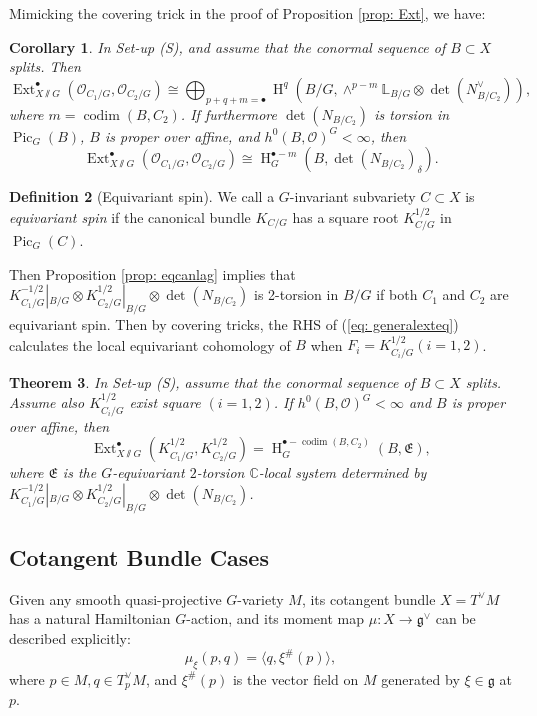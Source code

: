 \documentclass[12pt]{amsart}
\newtheorem{theorem}{Theorem}[section]
\newtheorem{corollary}[theorem]{Corollary}
\theoremstyle{definition}
\newtheorem{definition}[theorem]{Definition}
\theoremstyle{remark}
\numberwithin{equation}{section}
\newcommand{\CC}{\mathbb{C}}
\newcommand{\LL}{\mathbb{L}}
\newcommand{\shO}{\mathcal{O}}
\newcommand{\codim}{\operatorname{codim}}
\newcommand{\Ext}{\operatorname{Ext}}
\newcommand{\Pic}{\operatorname{Pic}}
\newcommand{\arw}{\longrightarrow}
\newcommand{\Hdot}{\operatorname{H}}
\begin{document}
Mimicking the covering trick in the proof of Proposition \ref{prop: Ext}, we have:
\begin{corollary}\label{symredext2} In Set-up (S), and assume that the conormal sequence of $B\subset X$ splits. Then 
   $$ \Ext^{\bullet}_{X\sslash  G}(\shO_{C_1/G},\shO_{C_2/G})\cong\bigoplus_{p+q+m=\bullet}
\Hdot^q(B/G, \wedge^{p-m}\LL_{B/G}\otimes \det(N_{B/C_2}^{\vee})), $$
where $m=\codim(B, C_2)$. 
If furthermore $\det(N_{B/C_2})$ is torsion in $\Pic_G(B)$, $B$ is proper over affine, and $h^0(B, \shO)^G<\infty$, then 
$$\Ext^{\bullet}_{X\sslash  G}(\shO_{C_1/G},\shO_{C_2/G})\cong \Hdot^{\bullet-m}_G(B, \det(N_{B/C_2})_{\delta}).$$

\end{corollary}
\begin{definition}[Equivariant spin]
    We call a $G$-invariant subvariety $C\subset X$ is \emph{equivariant spin} if the canonical bundle $K_{C/G}$ has a square root $K_{C/G}^{1/2}$ in $\Pic_G(C)$.
\end{definition}  
Then Proposition \ref{prop: eqcanlag} implies that $K_{C_1/G}^{-1/2}|_{B/G}\otimes K_{C_2/G}^{1/2}|_{B/G}\otimes \det(N_{B/C_2})$ is 2-torsion in $B/G$ if both $C_1$ and $C_2$ are equivariant spin. Then by covering tricks,  
the RHS of (\ref{eq: generalexteq}) calculates the local equivariant cohomology of $B$ when $F_i=K_{C_i/G}^{1/2} (i=1,2)$. 
 \begin{theorem}\label{thm: can}
    In Set-up (S), assume that the conormal sequence of $B\subset X$ splits. Assume also $K_{C_i/G}^{1/2}$ exist square $(i=1,2)$. If $h^0(B, \shO)^G<\infty$ and $B$ is proper over affine, then
    $$\Ext^{\bullet}_{X\sslash G}(K^{1/2}_{C_1/G}, K^{1/2}_{C_2/G})=\Hdot^{\bullet-\codim(B, C_2)}_G(B, \mathfrak{E}),$$
    where $\mathfrak{E}$ is the $G$-equivariant $2$-torsion $\CC$-local system determined by $K_{C_1/G}^{-1/2}|_{B/G}\otimes K_{C_2/G}^{1/2}|_{B/G}\otimes \det(N_{B/C_2})$.
\end{theorem}
\subsection{Cotangent Bundle Cases}
Given any smooth quasi-projective $G$-variety $M$, its cotangent bundle $X=T^{\vee}M$ has a natural Hamiltonian $G$-action, and its moment map $\mu: X\arw \mathfrak{g^{\vee}}$ can be described explicitly:
$$\mu_{\xi}(p, q)=\langle q, \xi^{\#}(p)\rangle,$$
where $p\in M, q\in T^{\vee}_pM$, and $\xi^{\#}(p)$ is the vector field on $M$ generated by $\xi\in \mathfrak{g}$ at $p$. 
\end{document}
